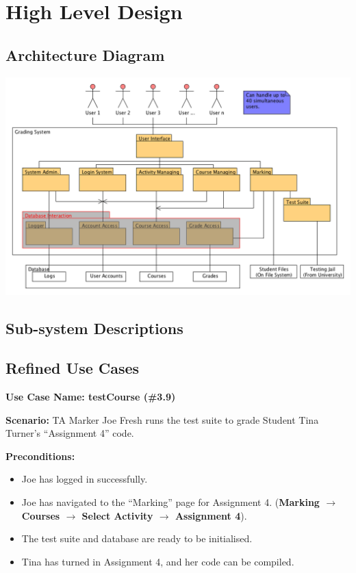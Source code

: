 \documentclass{article}
\begin{document}
\section{High Level Design}
\subsection{Architecture Diagram}
\centerline{\includegraphics[scale=0.6]{../images/architectureDiagram}}

\subsection{Sub-system Descriptions}
\subsection{Refined Use Cases}
\textbf{Use Case Name: testCourse (\#3.9)}

\textbf{Scenario:}
TA Marker Joe Fresh runs the test suite to grade Student Tina Turner’s “Assignment 4” 
code.

\textbf{Preconditions:}
\begin{itemize}
	\item Joe has logged in successfully.
	\item Joe has navigated to the “Marking” page for Assignment 4. (\textbf{Marking 
		$\rightarrow$ Courses $\rightarrow$ Select Activity $\rightarrow$ Assignment 4}).
	\item The test suite  and database are ready to be initialised.
	\item Tina has turned in Assignment 4, and her code can be compiled.
\end{itemize}
\end{document}
